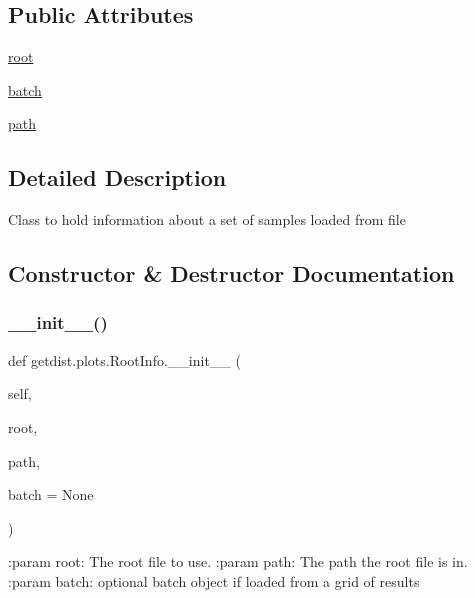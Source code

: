 \subsection*{Public Attributes}
\begin{DoxyCompactItemize}
\item 
\mbox{\hyperlink{classgetdist_1_1plots_1_1RootInfo_a0a9da48b51f158e5f0f25ceeebd159f4}{root}}
\item 
\mbox{\hyperlink{classgetdist_1_1plots_1_1RootInfo_ab25fd100bd82fad2632364a52d95e5ee}{batch}}
\item 
\mbox{\hyperlink{classgetdist_1_1plots_1_1RootInfo_aef4fe3a99208232dfff95b1349ba37e7}{path}}
\end{DoxyCompactItemize}


\subsection{Detailed Description}
\begin{DoxyVerb}Class to hold information about a set of samples loaded from file
\end{DoxyVerb}
 

\subsection{Constructor \& Destructor Documentation}
\mbox{\label{classgetdist_1_1plots_1_1RootInfo_ab2cb6f6bc5448a0848836e6a9a62fe1a}} 
\subsubsection{\texorpdfstring{\+\_\+\+\_\+init\+\_\+\+\_\+()}{\_\_init\_\_()}}
{\footnotesize\ttfamily def getdist.\+plots.\+Root\+Info.\+\_\+\+\_\+init\+\_\+\+\_\+ (\begin{DoxyParamCaption}\item[{}]{self,  }\item[{}]{root,  }\item[{}]{path,  }\item[{}]{batch = {\ttfamily None} }\end{DoxyParamCaption})}

\begin{DoxyVerb}:param root: The root file to use.
:param path: The path the root file is in.
:param batch: optional batch object if loaded from a grid of results
\end{DoxyVerb}
 

